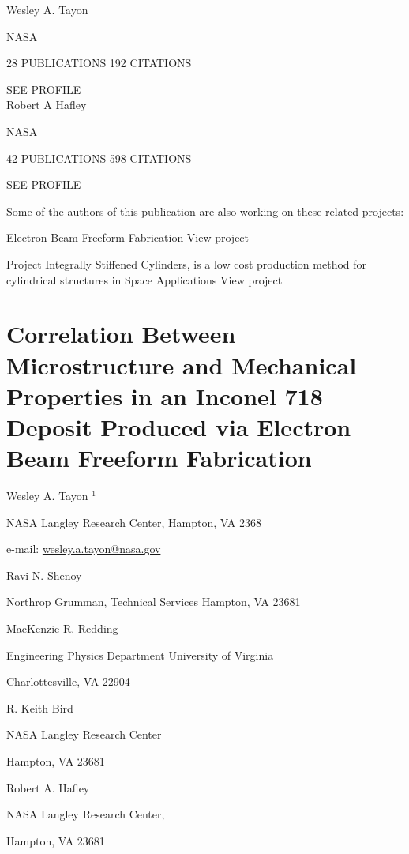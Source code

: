 \documentclass[10pt]{article}
\begin{document}
Wesley A. Tayon

NASA

28 PUBLICATIONS 192 CITATIONS

SEE PROFILE\\
Robert A Hafley

NASA

42 PUBLICATIONS 598 CITATIONS

SEE PROFILE

Some of the authors of this publication are also working on these related projects:

Electron Beam Freeform Fabrication View project

Project Integrally Stiffened Cylinders, is a low cost production method for cylindrical structures in Space Applications View project

\section*{Correlation Between Microstructure and Mechanical Properties in an Inconel 718 Deposit Produced via Electron Beam Freeform Fabrication}
Wesley A. Tayon ${ }^{1}$

NASA Langley Research Center, Hampton, VA 2368

e-mail: \href{mailto:wesley.a.tayon@nasa.gov}{wesley.a.tayon@nasa.gov}

Ravi N. Shenoy

Northrop Grumman, Technical Services Hampton, VA 23681

MacKenzie R. Redding

Engineering Physics Department University of Virginia

Charlottesville, VA 22904

R. Keith Bird

NASA Langley Research Center

Hampton, VA 23681

Robert A. Hafley

NASA Langley Research Center,

Hampton, VA 23681
\end{document}
